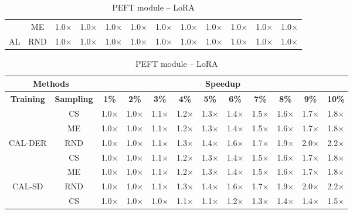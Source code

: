 \begin{table}[htbp]
\begin{subtable}{\linewidth}
\begin{tabular}{c|c|cccccccccc}
 & ME & 1.0$\times$ & 1.0$\times$ & 1.0$\times$ & 1.0$\times$ & 1.0$\times$ & 1.0$\times$ & 1.0$\times$ & 1.0$\times$ & 1.0$\times$ & 1.0$\times$\\

\multirow{-3}{*}{\raggedright\arraybackslash AL} & RND & 1.0$\times$ & 1.0$\times$ & 1.0$\times$ & 1.0$\times$ & 1.0$\times$ & 1.0$\times$ & 1.0$\times$ & 1.0$\times$ & 1.0$\times$ & 1.0$\times$\\
\bottomrule
\end{tabular}
\end{subtable}
\vspace{1em}
\begin{subtable}{\linewidth}
\centering
\caption{PEFT module -- LoRA}

\begin{tabular}{c|c|cccccccccc}
\toprule
\multicolumn{2}{c|}{\textbf{Methods}} & \multicolumn{10}{c}{\textbf{Speedup}} \\
\midrule
\textbf{Training} & \textbf{Sampling} & \textbf{1\%} & \textbf{2\%} & \textbf{3\%} & \textbf{4\%} & \textbf{5\%} & \textbf{6\%} & \textbf{7\%} & \textbf{8\%} & \textbf{9\%} & \textbf{10\%}\\
\midrule
 & CS & 1.0$\times$ & 1.0$\times$ & 1.1$\times$ & 1.2$\times$ & 1.3$\times$ & 1.4$\times$ & 1.5$\times$ & 1.6$\times$ & 1.7$\times$ & 1.8$\times$\\

 & ME & 1.0$\times$ & 1.0$\times$ & 1.1$\times$ & 1.2$\times$ & 1.3$\times$ & 1.4$\times$ & 1.5$\times$ & 1.6$\times$ & 1.7$\times$ & 1.8$\times$\\

\multirow{-3}{*}{\raggedright\arraybackslash CAL-DER} & RND & 1.0$\times$ & 1.0$\times$ & 1.1$\times$ & 1.3$\times$ & 1.4$\times$ & 1.6$\times$ & 1.7$\times$ & 1.9$\times$ & 2.0$\times$ & 2.2$\times$\\
\midrule
 & CS & 1.0$\times$ & 1.0$\times$ & 1.1$\times$ & 1.2$\times$ & 1.3$\times$ & 1.4$\times$ & 1.5$\times$ & 1.6$\times$ & 1.7$\times$ & 1.8$\times$\\

 & ME & 1.0$\times$ & 1.0$\times$ & 1.1$\times$ & 1.2$\times$ & 1.3$\times$ & 1.4$\times$ & 1.5$\times$ & 1.6$\times$ & 1.7$\times$ & 1.8$\times$\\

\multirow{-3}{*}{\raggedright\arraybackslash CAL-SD} & RND & 1.0$\times$ & 1.0$\times$ & 1.1$\times$ & 1.3$\times$ & 1.4$\times$ & 1.6$\times$ & 1.7$\times$ & 1.9$\times$ & 2.0$\times$ & 2.2$\times$\\
\midrule
 & CS & 1.0$\times$ & 1.0$\times$ & 1.0$\times$ & 1.1$\times$ & 1.1$\times$ & 1.2$\times$ & 1.3$\times$ & 1.4$\times$ & 1.4$\times$ & 1.5$\times$\\


\end{tabular}
\end{subtable}
\end{table}
